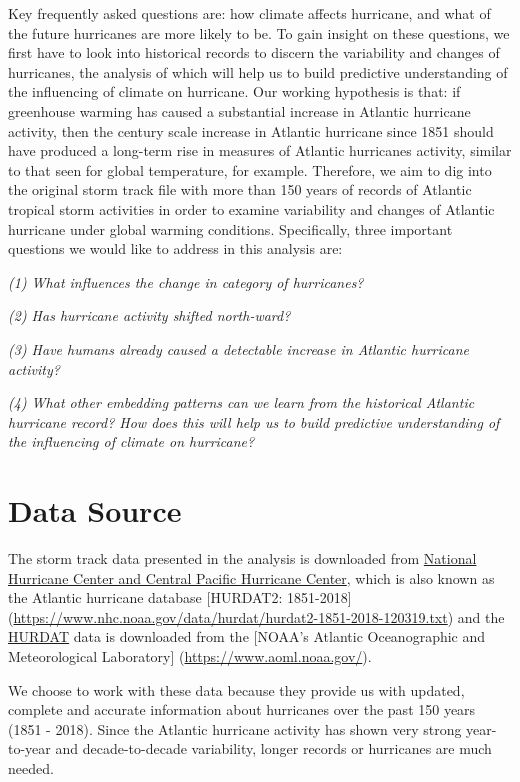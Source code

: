 \documentclass[]{book}
\begin{document}
Key frequently asked questions are: how climate affects hurricane, and what of the future hurricanes are more likely to be. To gain insight on these questions, we first have to look into historical records to discern the variability and changes of hurricanes, the analysis of which will help us to build predictive understanding of the influencing of climate on hurricane. Our working hypothesis is that: if greenhouse warming has caused a substantial increase in Atlantic hurricane activity, then the century scale increase in Atlantic hurricane since 1851 should have produced a long-term rise in measures of Atlantic hurricanes activity, similar to that seen for global temperature, for example. Therefore, we aim to dig into the original storm track file with more than 150 years of records of Atlantic tropical storm activities in order to examine variability and changes of Atlantic hurricane under global warming conditions. Specifically, three important questions we would like to address in this analysis are:

\emph{(1) What influences the change in category of hurricanes?}

\emph{(2) Has hurricane activity shifted north-ward?}

\emph{(3) Have humans already caused a detectable increase in Atlantic hurricane activity?}

\emph{(4) What other embedding patterns can we learn from the historical Atlantic hurricane record? How does this will help us to build predictive understanding of the influencing of climate on hurricane?}

\hypertarget{datasource}{%
\chapter{Data Source}\label{datasource}}

The storm track data presented in the analysis is downloaded from \href{https://www.nhc.noaa.gov/data/\#hurdat}{National Hurricane Center and Central Pacific Hurricane Center}, which is also known as the Atlantic hurricane database {[}HURDAT2: 1851-2018{]} (\url{https://www.nhc.noaa.gov/data/hurdat/hurdat2-1851-2018-120319.txt}) and the \href{https://www.aoml.noaa.gov/hrd/hurdat/comparison_table.html.}{HURDAT} data is downloaded from the {[}NOAA's Atlantic Oceanographic and Meteorological Laboratory{]} (\url{https://www.aoml.noaa.gov/}).

We choose to work with these data because they provide us with updated, complete and accurate information about hurricanes over the past 150 years (1851 - 2018). Since the Atlantic hurricane activity has shown very strong year-to-year and decade-to-decade variability, longer records or hurricanes are much needed.
\end{document}

